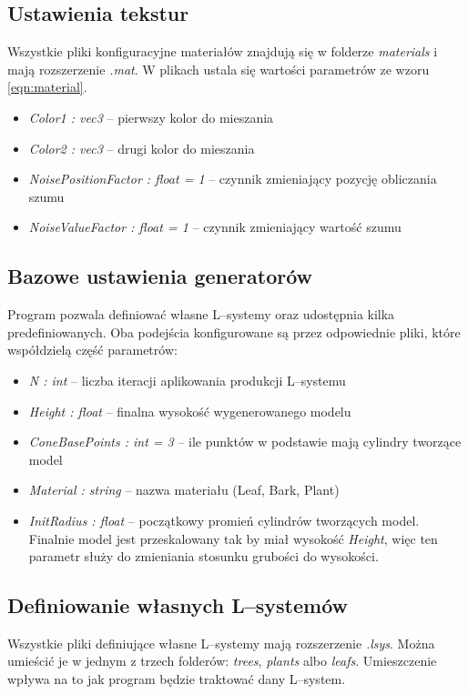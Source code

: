 \documentclass[inz,longabstract]{iithesis}
\begin{document}
        \subsection{Ustawienia tekstur}
        Wszystkie pliki konfiguracyjne materiałów znajdują się w folderze \textit{materials} i mają rozszerzenie \textit{.mat}. W plikach ustala się wartości parametrów ze wzoru \ref{eqn:material}. 
        \begin{itemize}
            \item \textit{Color1 : vec3} -- pierwszy kolor do mieszania
            \item \textit{Color2 : vec3} -- drugi kolor do mieszania
            \item \textit{NoisePositionFactor : float = 1} -- czynnik zmieniający pozycję obliczania szumu 
            \item \textit{NoiseValueFactor : float = 1} -- czynnik zmieniający wartość szumu
        \end{itemize}
        
        \subsection{Bazowe ustawienia generatorów}
        Program pozwala definiować własne L--systemy oraz udostępnia kilka predefiniowanych. Oba podejścia konfigurowane są przez odpowiednie pliki, które współdzielą część parametrów:
        
        \begin{itemize}
            \item \textit{N : int} -- liczba iteracji aplikowania produkcji L--systemu 
            \item \textit{Height : float} -- finalna wysokość wygenerowanego modelu
            \item \textit{ConeBasePoints : int = 3} -- ile punktów w podstawie mają cylindry tworzące model
            \item \textit{Material : string} -- nazwa materiału (Leaf, Bark, Plant)
            \item \textit{InitRadius : float} -- początkowy promień cylindrów tworzących model. Finalnie model jest przeskalowany tak by miał wysokość \textit{Height}, więc ten parametr służy do zmieniania stosunku grubości do wysokości. 
        \end{itemize}
        
        \subsection{Definiowanie własnych L--systemów}
        Wszystkie pliki definiujące własne L--systemy mają rozszerzenie \textit{.lsys}. Można umieścić je w jednym z trzech folderów: \textit{trees}, \textit{plants} albo \textit{leafs}. Umieszczenie wpływa na to jak program będzie traktować dany L--system.
        
\end{document}
